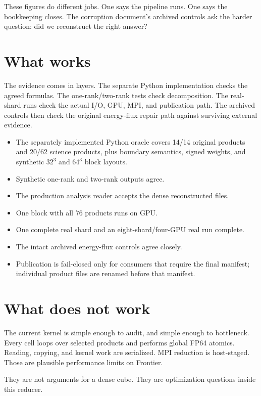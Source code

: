 \documentclass[11pt]{article}
\begin{document}
These figures do different jobs. One says the pipeline runs. One says the
bookkeeping closes. The corruption document's archived controls ask the harder
question: did we reconstruct the right answer?

\section{What works}

The evidence comes in layers. The separate Python implementation checks the
agreed formulas. The
one-rank/two-rank tests check decomposition. The real-shard runs check the
actual I/O, GPU, MPI, and publication path. The archived controls then check
the original energy-flux repair path against surviving external evidence.

\begin{itemize}
  \item The separately implemented Python oracle covers 14/14 original
        products and 20/62 science products, plus boundary semantics, signed
        weights, and synthetic \(32^3\) and \(64^3\) block layouts.
  \item Synthetic one-rank and two-rank outputs agree.
  \item The production analysis reader accepts the dense reconstructed files.
  \item One block with all 76 products runs on GPU.
  \item One complete real shard and an eight-shard/four-GPU real run complete.
  \item The intact archived energy-flux controls agree closely.
  \item Publication is fail-closed only for consumers that require the final
        manifest; individual product files are renamed before that manifest.
\end{itemize}

\section{What does not work}

The current kernel is simple enough to audit, and simple enough to bottleneck.
Every cell loops over selected products and performs global FP64 atomics.
Reading, copying, and kernel work are serialized. MPI reduction is host-staged.
Those are plausible performance limits on Frontier.

They are not arguments for a dense cube. They are optimization questions
inside this reducer.
\end{document}
